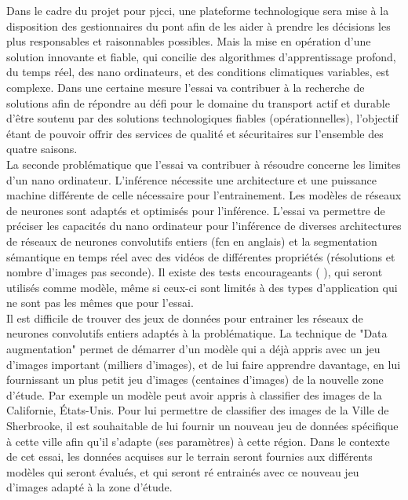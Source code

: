 ﻿\noindent Dans le cadre du projet pour \acrshort{pjcci}, une plateforme technologique sera mise à la disposition des gestionnaires du pont afin de les aider à prendre les décisions les plus responsables et raisonnables possibles. Mais la mise en opération d'une solution innovante et fiable, qui concilie des algorithmes d'apprentissage profond, du temps réel, des nano ordinateurs, et des conditions climatiques variables, est complexe. Dans une certaine mesure l'essai va contribuer à la recherche de solutions afin de répondre au défi pour le domaine du transport actif et durable d'être soutenu par des solutions technologiques fiables (opérationnelles), l'objectif étant de pouvoir offrir des services de qualité et sécuritaires sur l'ensemble des quatre saisons.
\vspace{\baselineskip}
\\
\noindent La seconde problématique que l'essai va contribuer à résoudre concerne les limites d'un nano ordinateur. L'inférence nécessite une architecture et une puissance machine différente de celle nécessaire pour l'entrainement. Les modèles de réseaux de neurones sont adaptés et optimisés pour l'inférence. L'essai va permettre de préciser les capacités du nano ordinateur pour l'inférence de diverses architectures de réseaux de neurones convolutifs entiers (\acrshort{fcn} en anglais) et la segmentation sémantique en temps réel avec des vidéos de différentes propriétés (résolutions et nombre d'images pas seconde). Il existe des tests encourageants (\cite{nvidia_jetson_2019-1} \cite{nguyen_mavnet_2019} \cite{chong_real-time_1992}), qui seront utilisés comme modèle, même si ceux-ci sont limités à des types d'application qui ne sont pas les mêmes que pour l'essai.
\vspace{\baselineskip}
\\
\noindent Il est difficile de trouver des jeux de données pour entrainer les réseaux de neurones convolutifs entiers adaptés à la problématique. La technique de "Data augmentation" permet de démarrer d'un modèle qui a déjà appris avec un jeu d'images important (milliers d'images), et de lui faire apprendre davantage, en lui fournissant un plus petit jeu d'images (centaines d'images) de la nouvelle zone d'étude. Par exemple un modèle peut avoir appris à classifier des images de la Californie, États-Unis. Pour lui permettre de classifier des images de la Ville de Sherbrooke, il est souhaitable de lui fournir un nouveau jeu de données spécifique à cette ville afin qu'il s'adapte (ses paramètres) à cette région. Dans le contexte de cet essai, les données acquises sur le terrain seront fournies aux différents modèles qui seront évalués, et qui seront ré entrainés avec ce nouveau jeu d'images adapté à la zone d'étude.
